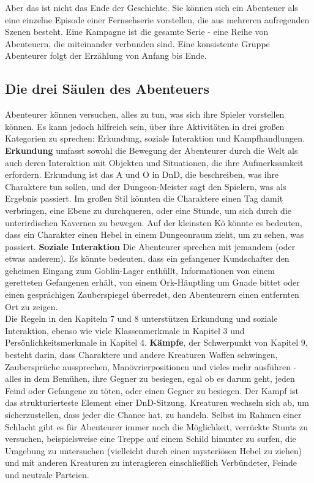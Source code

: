 Aber das ist nicht das Ende der Geschichte. Sie können sich ein Abenteuer als eine einzelne Episode einer Fernsehserie vorstellen, die aus mehreren aufregenden Szenen besteht. Eine Kampagne ist die gesamte Serie - eine Reihe von Abenteuern, die miteinander verbunden sind. Eine konsistente Gruppe Abenteurer folgt der Erzählung von Anfang bis Ende.

\subsection{Die drei Säulen des Abenteuers}
Abenteurer können versuchen, alles zu tun, was sich ihre Spieler vorstellen können. Es kann jedoch hilfreich sein, über ihre Aktivitäten in drei großen Kategorien zu sprechen: Erkundung, soziale Interaktion und Kampfhandlungen.\\
\textbf{Erkundung} umfasst sowohl die Bewegung der Abenteurer durch die Welt als auch deren Interaktion mit Objekten und Situationen, die ihre Aufmerksamkeit erfordern. Erkundung ist das A und O in DnD, die beschreiben, was ihre Charaktere tun sollen, und der Dungeon-Meister sagt den Spielern, was als Ergebnis passiert. Im großen Stil könnten die Charaktere einen Tag damit verbringen, eine Ebene zu durchqueren, oder eine Stunde, um sich durch die unterirdischen Kavernen zu bewegen. Auf der kleinsten Kö könnte es bedeuten, dass ein Charakter einen Hebel in einem Dungeonraum zieht, um zu sehen, was passiert.
\textbf{Soziale Interaktion}
Die Abenteurer sprechen mit jemandem (oder etwas anderem). Es könnte bedeuten, dass ein gefangener Kundschafter den geheimen Eingang zum Goblin-Lager enthüllt, Informationen von einem geretteten Gefangenen erhält, von einem Ork-Häuptling um Gnade bittet oder einen gesprächigen Zauberspiegel überredet, den Abenteurern einen entfernten Ort zu zeigen.\\
Die Regeln in den Kapiteln 7 und 8 unterstützen Erkundung und soziale Interaktion, ebenso wie viele Klassenmerkmale in Kapitel 3 und Persönlichkeitsmerkmale in Kapitel 4.
\textbf{Kämpfe}, der Schwerpunkt von Kapitel 9, besteht darin, dass Charaktere und andere Kreaturen Waffen schwingen, Zaubersprüche aussprechen, Manövrierpositionen und vieles mehr ausführen - alles in dem Bemühen, ihre Gegner zu besiegen, egal ob es darum geht, jeden Feind oder Gefangene zu töten, oder einen Gegner zu besiegen. Der Kampf ist das strukturierteste Element einer DnD-Sitzung. Kreaturen wechseln sich ab, um sicherzustellen, dass jeder die Chance hat, zu handeln. Selbst im Rahmen einer Schlacht gibt es für Abenteurer immer noch die Möglichkeit, verrückte Stunts zu versuchen, beispielsweise eine Treppe auf einem Schild hinunter zu surfen, die Umgebung zu untersuchen (vielleicht durch einen mysteriösen Hebel zu ziehen) und mit anderen Kreaturen zu interagieren einschließlich Verbündeter, Feinde und neutrale Parteien.
